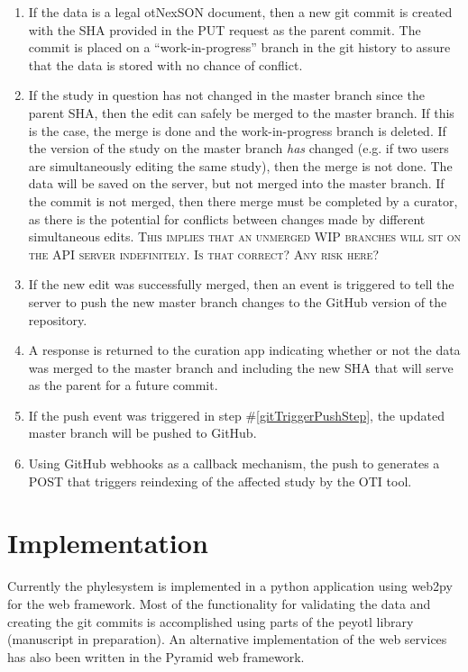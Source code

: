 \documentclass{bioinfo}
\newcommand{\ps}{phylesystem\xspace}
\newcommand{\nexson}{otNexSON\xspace}
\newcommand{\jfacomment}[1]{{\color{orange} \textsc{#1}}\xspace}
\begin{document}
\begin{methods}
\begin{enumerate}
    \item \label{gitSaveStep} If the data is a legal \nexson document, then a new git commit is created with the SHA
        provided in the PUT request as the parent commit. The commit is placed on a 
        ``work-in-progress'' branch in the git history to assure that the data is stored with 
        no chance of conflict.
    \item \label{gitMergeStep} If the study in question has not changed in the master branch 
        since the parent SHA, then the edit can safely be merged to the master branch.
        If this is the case, the merge is done and the work-in-progress branch is deleted.
        If the version of the study on the master branch {\em has} changed (e.g. if two users are simultaneously editing the same study),
        then the merge is not done. The data will be saved on the server, but not merged into the master branch.
        If the commit is not merged, then there merge must be completed by a curator, as there is the potential for conflicts between changes made by different simultaneous edits.
        \jfacomment{This implies that an unmerged WIP branches will sit on the API server indefinitely. Is that correct? Any risk here?}
    \item\label{gitTriggerPushStep}  If the new edit was successfully merged, then an event is triggered to tell the server to push the new master branch changes to the GitHub version
        of the repository.
    \item\label{respondStep} A response is returned to the curation app indicating whether or not the data was 
        merged to the master branch and including the new SHA that will serve as the parent for a future commit.
    \item\label{pushStep}  If the push event was triggered in step \#\ref{gitTriggerPushStep}, the updated master branch will be pushed to GitHub.
    \item\label{webHookStep} Using GitHub webhooks as a callback mechanism, the push to generates a POST that triggers reindexing
        of the affected study by the OTI tool.
\end{enumerate}

\section{Implementation}
Currently the \ps is implemented in a python application using web2py for the web framework.
Most of the functionality for validating the data and creating the git commits is accomplished using
    parts of the peyotl library (manuscript in preparation).
An alternative implementation of the web services has also been written in the Pyramid
    web framework.


\end{methods}
\end{document}
